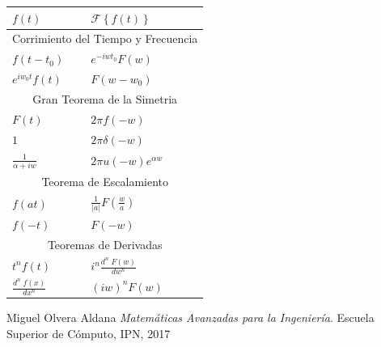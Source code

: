 \documentclass[12pt, fleqn]{report}                             %
\newcommand{\FourierT}[1]{\mathscr{F} \left\{ #1 \right\} }     %
\begin{document}
            \clearpage

            \begin{table}[ht]
                \begin{tabular}{|m{16em}|m{16em}|@{}m{0pt}@{}}
                    \hline
                    \large{$f(t)$}          & \large{$\FourierT{f(t)}$}         &\\[2em]    \hline\hline

                    \multicolumn{3}{|c|}{Corrimiento del Tiempo y Frecuencia}   \\          \hline
                    $f(t - t_0)       $     & $e^{-iwt_0} F(w)       $          &\\[1em]    \hline
                    $e^{iw_0t} f(t)   $     & $F(w - w_0)            $          &\\[1em]    \hline\hline

                    \multicolumn{3}{|c|}{Gran Teorema de la Simetria}          \\           \hline
                    $F(t)             $     & $2\pi f(-w)             $        &\\[1em]     \hline
                    $1                $     & $2\pi \delta(-w)        $        &\\[1em]     \hline
                    $\frac{1}{\alpha + iw}$ & $2\pi u(-w) e^{\alpha w}$        &\\[1em]     \hline\hline

                    \multicolumn{3}{|c|}{Teorema de Escalamiento}               \\          \hline
                    $f(at)            $     & $\frac{1}{|a|} F(\frac{w}{a})$   &\\[1em]     \hline
                    $f(-t)            $     & $F(-w)$                          &\\[1em]     \hline\hline

                    \multicolumn{3}{|c|}{Teoremas de Derivadas}                 \\          \hline
                    $t^n f(t)               $ & $i^n \frac{d^n \; F(w)}{dw^n}$ &\\[1em]     \hline
                    $\frac{d^n \; f(x)}{dx^n}$& $(iw)^n F(w)$                  &\\[1em]     \hline
                \end{tabular}
            \end{table}







\begin{thebibliography}{10}

        Miguel Olvera Aldana
        \textit{Matemáticas Avanzadas para la Ingeniería}. 
        Escuela Superior de Cómputo, IPN, 2017

\end{thebibliography}
\end{document}
